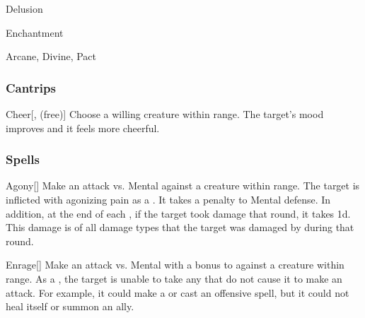 \newpage
\begin{spellsection}{Delusion}

\begin{spellheader}
\end{spellheader}


 Enchantment

 Arcane, Divine, Pact

\subsubsection{Cantrips}


\begin{apability}{Cheer}[,  (free)]
Choose a willing creature within \rngclose range.
The target's mood improves and it feels more cheerful.
\end{apability}

\end{spellsection}


\subsubsection{Spells}


\lowercase{\hypertarget{spell:Agony}{}}\label{spell:Agony}
\begin{freeability}[\nth{1}]{\hypertarget{spell:Agony}{Agony}}[]
Make an attack vs. Mental against a creature within \rngmed range.
\hit The target is inflicted with agonizing pain as a .
It takes a  penalty to Mental defense.
In addition, at the end of each , if the target took damage that round, it takes  \minus1d.
This damage is of all damage types that the target was damaged by during that round.
\end{freeability}
\vspace{0.25em}



\lowercase{\hypertarget{spell:Enrage}{}}\label{spell:Enrage}
\begin{freeability}[\nth{1}]{\hypertarget{spell:Enrage}{Enrage}}[]
Make an attack vs. Mental with a  bonus to  against a creature within \rngmed range.
\hit As a , the target is unable to take any  that do not cause it to make an attack.
For example, it could make a  or cast an offensive spell, but it could not heal itself or summon an ally.
\end{freeability}
\vspace{0.25em}



